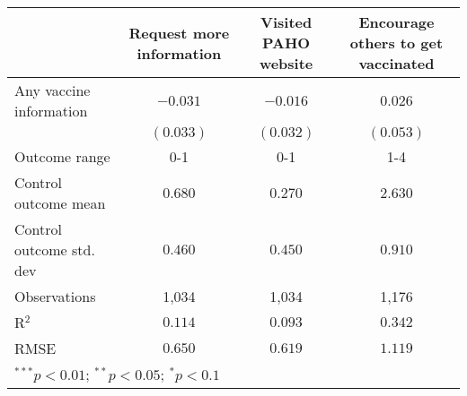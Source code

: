 \begin{table}
\begin{center}
\begin{tabular}{l c c c}
\hline
 & Request more information & Visited PAHO website & Encourage others to get vaccinated \\
\hline
Any vaccine information  & $-0.031$  & $-0.016$  & $0.026$   \\
                         & $(0.033)$ & $(0.032)$ & $(0.053)$ \\
\hline
Outcome range            & 0-1       & 0-1       & 1-4       \\
Control outcome mean     & $0.680$   & $0.270$   & $2.630$   \\
Control outcome std. dev & $0.460$   & $0.450$   & $0.910$   \\
Observations             & 1,034     & 1,034     & 1,176     \\
R$^{2}$                  & $0.114$   & $0.093$   & $0.342$   \\
RMSE                     & $0.650$   & $0.619$   & $1.119$   \\
\hline
\multicolumn{4}{l}{\scriptsize{$^{***}p<0.01$; $^{**}p<0.05$; $^{*}p<0.1$}}
\end{tabular}
\caption{}
\label{table:Tables and Figures/SI_table21_anyinfo_Peru_behav}
\end{center}
\end{table}
